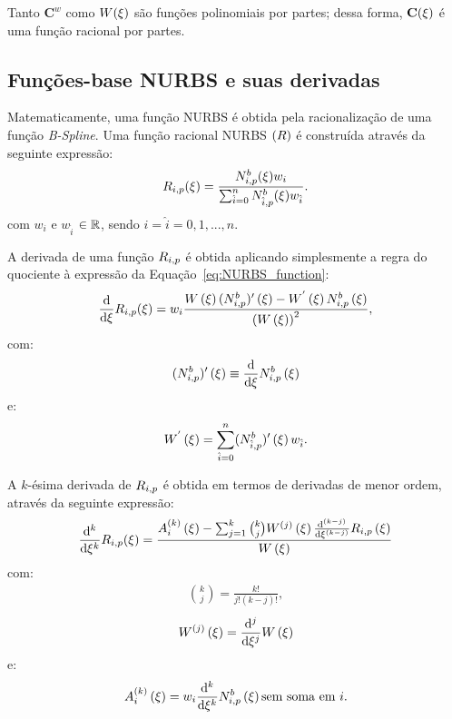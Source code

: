 Tanto $\mathbf{C}^w$ como $W(\xi)$ são funções polinomiais por partes; dessa forma, $\mathbf{C}(\xi)$ é uma função racional por partes.

\subsection{Funções-base NURBS e suas derivadas}

Matematicamente, uma função NURBS é obtida pela racionalização de uma função \textit{B-Spline}. Uma função racional NURBS $\left(R\right)$ é construída através da seguinte expressão:
\begin{align}
R_{i,p}(\xi) = \frac{N^b_{i,p}(\xi)w_i}{\sum_{\hat{i}=0}^{n}N^b_{\hat{i},p}(\xi)w_{\hat{i}}}.  \label{eq:NURBS_function}
\end{align}
\noindent com $w_{i}$ e $w_{\hat{i}}$ $\in \mathbb{R}$, sendo $i = \hat{i} =  0, 1, ... , n$.

A derivada de uma função $R_{i,p}$ é obtida aplicando simplesmente a regra do quociente à expressão da Equação~\eqref{eq:NURBS_function}:
\begin{align}
	\frac{\mathrm{d}}{\mathrm{d} \xi} R_{i,p}(\xi) = w_{i} \frac{W\left(\xi\right)(N^{b}_{i,p})'\left(\xi\right) - W^{'}\left(\xi\right)N^b_{i,p}\left(\xi\right)}{\left(W\left(\xi\right)\right)^2},
\end{align}
\noindent com:
\begin{align}
	(N^{b}_{i,p})'\left(\xi\right) \equiv \frac{\mathrm{d}}{\mathrm{d} \xi} N^b_{i,p}\left(\xi\right)
\end{align}
\noindent e:
\begin{align}
	W^{'}\left(\xi\right) = \sum_{\hat{i}=0}^{n} (N^{b}_{\hat{i},p})' \left(\xi\right) w_{\hat{i}}.
\end{align}

A $k$-ésima derivada de $R_{i,p}$ é obtida em termos de derivadas de menor ordem, através da seguinte expressão:
\begin{align}
\frac{\mathrm{d}^{k}}{\mathrm{d} \xi^{k}} R_{i,p}(\xi) = \frac{A_{i}^{\left(k\right)} \left(\xi\right) - \sum_{j=1}^{k} \binom{k}{j} W^{\left(j\right)} \left(\xi\right) \frac{\mathrm{d}^{(k-j)}}{\mathrm{d} \xi^{(k-j)}}R_{i,p} \left(\xi\right)}{W\left(\xi\right)}
\end{align}
\noindent com:
\begin{align}
\binom{k}{j} = \frac{k!}{j!\left(k-j\right)!},
\end{align}
\begin{align}
	W^{\left(j\right)}\left(\xi\right) = \frac{\mathrm{d}^{j}}{\mathrm{d} \xi^{j}} W \left(\xi\right)
\end{align}
\noindent e:
\begin{align}
 A_{i}^{\left(k\right)} \left(\xi\right)  = w_i \frac{\mathrm{d}^k}{\mathrm{d}\xi^k}N^b_{i,p} \left(\xi\right)\text{sem soma em $i$}.
\end{align}

